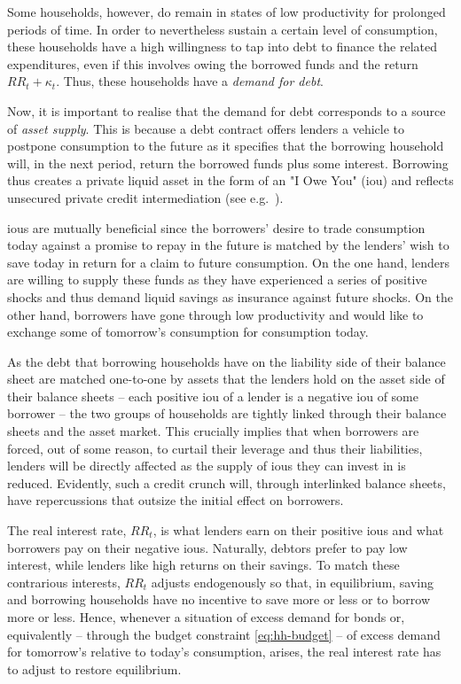 \documentclass[a4paper,12pt]{article} %
\numberwithin{equation}{section} %
\numberwithin{figure}{section}
\numberwithin{table}{section}
\begin{document}
Some households, however, do remain in states of low productivity for prolonged periods of time. In order to nevertheless sustain a certain level of consumption, these households have a high willingness to tap into debt to finance the related expenditures, even if this involves owing the borrowed funds and the return $RR_t + \kappa_t$. Thus, these households have a \textit{demand for debt}.

Now, it is important to realise that the demand for debt corresponds to a source of \textit{asset supply}. This is because a debt contract offers lenders a vehicle to postpone consumption to the future as it specifies that the borrowing household will, in the next period, return the borrowed funds plus some interest. Borrowing thus creates a private liquid asset in the form of an "I Owe You" (\Gls{iou}) and reflects unsecured private credit intermediation (see e.g.~\cite{bayer2023}).

\Gls{iou}s are mutually beneficial since the borrowers' desire to trade consumption today against a promise to repay in the future is matched by the lenders' wish to save today in return for a claim to future consumption. On the one hand, lenders are willing to supply these funds as they have experienced a series of positive shocks and thus demand liquid savings as insurance against future shocks. On the other hand, borrowers have gone through low productivity and would like to exchange some of tomorrow's consumption for consumption today.

As the debt that borrowing households have on the liability side of their balance sheet are matched one-to-one by assets that the lenders hold on the asset side of their balance sheets -- each positive \Gls{iou} of a lender is a negative \Gls{iou} of some borrower -- the two groups of households are tightly linked through their balance sheets and the asset market. This crucially implies that when borrowers are forced, out of some reason, to curtail their leverage and thus their liabilities, lenders will be directly affected as the supply of \Gls{iou}s they can invest in is reduced. Evidently, such a credit crunch will, through interlinked balance sheets, have repercussions that outsize the initial effect on borrowers. %

The real interest rate, $RR_t$, is what lenders earn on their positive \Gls{iou}s and what borrowers pay on their negative \Gls{iou}s. Naturally, debtors prefer to pay low interest, while lenders like high returns on their savings. To match these contrarious interests, $RR_t$ adjusts endogenously so that, in equilibrium, saving and borrowing households have no incentive to save more or less or to borrow more or less. Hence, whenever a situation of excess demand for bonds or, equivalently -- through the budget constraint \eqref{eq:hh-budget} -- of excess demand for tomorrow's relative to today's consumption, arises, the real interest rate has to adjust to restore equilibrium.
\end{document}
